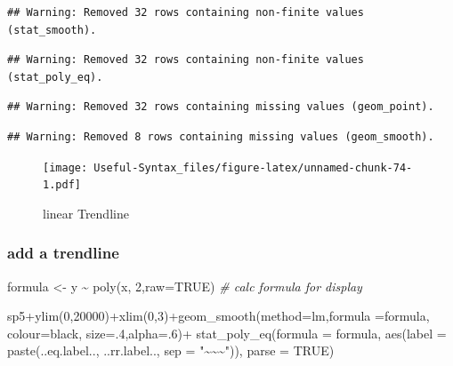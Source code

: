 \documentclass[
]{article}
\newenvironment{Shaded}{\begin{snugshade}}{\end{snugshade}}
\newcommand{\AttributeTok}[1]{\textcolor[rgb]{0.77,0.63,0.00}{#1}}
\newcommand{\CommentTok}[1]{\textcolor[rgb]{0.56,0.35,0.01}{\textit{#1}}}
\newcommand{\ConstantTok}[1]{\textcolor[rgb]{0.00,0.00,0.00}{#1}}
\newcommand{\DecValTok}[1]{\textcolor[rgb]{0.00,0.00,0.81}{#1}}
\newcommand{\FunctionTok}[1]{\textcolor[rgb]{0.00,0.00,0.00}{#1}}
\newcommand{\NormalTok}[1]{#1}
\newcommand{\OtherTok}[1]{\textcolor[rgb]{0.56,0.35,0.01}{#1}}
\newcommand{\SpecialCharTok}[1]{\textcolor[rgb]{0.00,0.00,0.00}{#1}}
\newcommand{\StringTok}[1]{\textcolor[rgb]{0.31,0.60,0.02}{#1}}
\begin{document}
\begin{verbatim}
## Warning: Removed 32 rows containing non-finite values (stat_smooth).
\end{verbatim}

\begin{verbatim}
## Warning: Removed 32 rows containing non-finite values (stat_poly_eq).
\end{verbatim}

\begin{verbatim}
## Warning: Removed 32 rows containing missing values (geom_point).
\end{verbatim}

\begin{verbatim}
## Warning: Removed 8 rows containing missing values (geom_smooth).
\end{verbatim}

\begin{figure}
\centering
\texttt{[image: Useful-Syntax\_files/figure-latex/unnamed-chunk-74-1.pdf]}
\caption{\label{fig:unnamed-chunk-74}linear Trendline}
\end{figure}

\hypertarget{add-a-trendline-1}{%
\subsubsection{add a trendline}\label{add-a-trendline-1}}

\begin{Shaded}
\begin{Highlighting}[]
\NormalTok{formula }\OtherTok{\textless{}{-}}\NormalTok{ y }\SpecialCharTok{\textasciitilde{}} \FunctionTok{poly}\NormalTok{(x, }\DecValTok{2}\NormalTok{,}\AttributeTok{raw=}\ConstantTok{TRUE}\NormalTok{) }\CommentTok{\# calc formula for display}

\NormalTok{sp5}\SpecialCharTok{+}\FunctionTok{ylim}\NormalTok{(}\DecValTok{0}\NormalTok{,}\DecValTok{20000}\NormalTok{)}\SpecialCharTok{+}\FunctionTok{xlim}\NormalTok{(}\DecValTok{0}\NormalTok{,}\DecValTok{3}\NormalTok{)}\SpecialCharTok{+}\FunctionTok{geom\_smooth}\NormalTok{(}\AttributeTok{method=}\StringTok{\textquotesingle{}lm\textquotesingle{}}\NormalTok{,}\AttributeTok{formula =}\NormalTok{formula,}
                                        \AttributeTok{colour=}\StringTok{\textquotesingle{}black\textquotesingle{}}\NormalTok{, }\AttributeTok{size=}\NormalTok{.}\DecValTok{4}\NormalTok{,}\AttributeTok{alpha=}\NormalTok{.}\DecValTok{6}\NormalTok{)}\SpecialCharTok{+}
  \FunctionTok{stat\_poly\_eq}\NormalTok{(}\AttributeTok{formula =}\NormalTok{ formula,}
               \FunctionTok{aes}\NormalTok{(}\AttributeTok{label =} \FunctionTok{paste}\NormalTok{(..eq.label.., ..rr.label..,}
                                                        \AttributeTok{sep =} \StringTok{"\textasciitilde{}\textasciitilde{}\textasciitilde{}"}\NormalTok{)), }\AttributeTok{parse =} \ConstantTok{TRUE}\NormalTok{)}
\end{Highlighting}
\end{Shaded}
\end{document}
